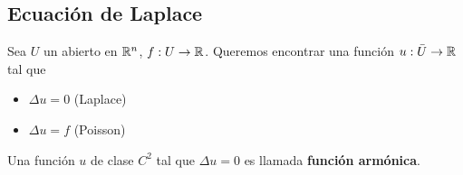 \subsection{Ecuaci\'on de Laplace}

Sea $U$ un abierto en $\mathbb R^n$, $f: U \to \mathbb R$.
Queremos encontrar una funci\'on $u: \bar U \to \mathbb R$ tal que

\begin{itemize}
  \item $\Delta u = 0$ (Laplace)
  \item $\Delta u = f$ (Poisson)
\end{itemize}

\begin{defn}
  Una funci\'on $u$ de clase $C^2$ tal que $\Delta u = 0$ es llamada
  \textbf{funci\'on arm\'onica}.
\end{defn}
